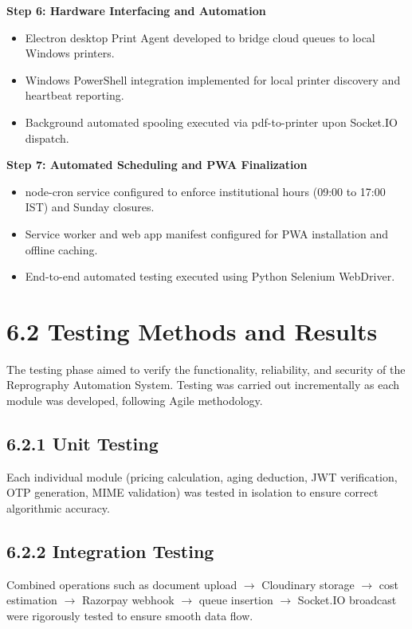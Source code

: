 \documentclass[12pt,a4paper]{report}
\begin{document}
\noindent\textbf{Step 6: Hardware Interfacing and Automation}
\begin{itemize}[leftmargin=0.35in, itemsep=1pt]
  \item Electron desktop Print Agent developed to bridge cloud queues to local Windows printers.
  \item Windows PowerShell integration implemented for local printer discovery and heartbeat reporting.
  \item Background automated spooling executed via pdf-to-printer upon Socket.IO dispatch.
\end{itemize}

\noindent\textbf{Step 7: Automated Scheduling and PWA Finalization}
\begin{itemize}[leftmargin=0.35in, itemsep=1pt]
  \item node-cron service configured to enforce institutional hours (09:00 to 17:00 IST) and Sunday closures.
  \item Service worker and web app manifest configured for PWA installation and offline caching.
  \item End-to-end automated testing executed using Python Selenium WebDriver.
\end{itemize}

\section{6.2 Testing Methods and Results}
The testing phase aimed to verify the functionality, reliability, and security of the Reprography Automation System. Testing was carried out incrementally as each module was developed, following Agile methodology.

\subsection{6.2.1 Unit Testing}
Each individual module (pricing calculation, aging deduction, JWT verification, OTP generation, MIME validation) was tested in isolation to ensure correct algorithmic accuracy.

\subsection{6.2.2 Integration Testing}
Combined operations such as document upload $\rightarrow$ Cloudinary storage $\rightarrow$ cost estimation $\rightarrow$ Razorpay webhook $\rightarrow$ queue insertion $\rightarrow$ Socket.IO broadcast were rigorously tested to ensure smooth data flow.
\end{document}
